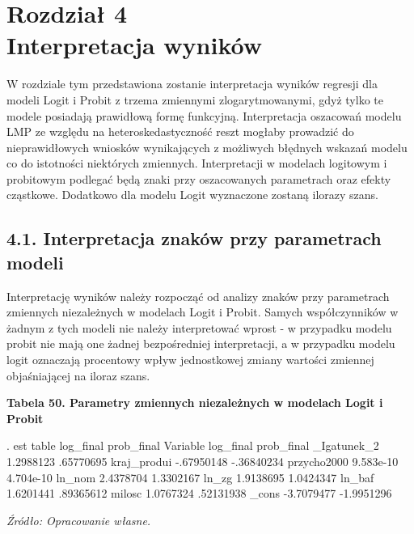 \newpage
\chapter*{Rozdział 4 \\ \vspace{1cm} Interpretacja wyników}
 
 W rozdziale tym przedstawiona zostanie interpretacja wyników regresji dla modeli Logit i Probit z trzema zmiennymi zlogarytmowanymi, gdyż tylko te modele posiadają prawidłową formę funkcyjną. Interpretacja oszacowań modelu LMP ze względu na heteroskedastyczność reszt mogłaby prowadzić do nieprawidłowych wniosków wynikających z możliwych błędnych wskazań modelu co do istotności niektórych zmiennych. Interpretacji w modelach logitowym i probitowym podlegać będą znaki przy oszacowanych parametrach oraz efekty cząstkowe. Dodatkowo dla modelu Logit wyznaczone zostaną ilorazy szans. 
 
\section*{4.1. Interpretacja znaków przy parametrach modeli}
 
Interpretację wyników należy rozpocząć od analizy znaków przy parametrach zmiennych niezależnych w modelach Logit i Probit. Samych współczynników w żadnym z tych modeli nie należy interpretować wprost - w przypadku modelu probit nie mają one żadnej bezpośredniej interpretacji, a w przypadku modelu logit oznaczają procentowy wpływ jednostkowej zmiany wartości zmiennej objaśniającej na iloraz szans.
 
\vspace{0.3cm}
\textbf{Tabela 50. Parametry zmiennych niezależnych w modelach Logit i Probit}
\begin{stlog}
. est table log_final prob_final 
    Variable {\VBAR} log_final    prob_final  
 _Igatunek_2 {\VBAR}  1.2988123    .65770695  
kraj_produ{\tytilde}i {\VBAR} -.67950148   -.36840234  
przycho{\tytilde}2000 {\VBAR}  9.583e-10    4.704e-10  
      ln_nom {\VBAR}  2.4378704    1.3302167  
       ln_zg {\VBAR}  1.9138695    1.0424347  
      ln_baf {\VBAR}  1.6201441    .89365612  
      milosc {\VBAR}  1.0767324    .52131938  
       _cons {\VBAR} -3.7079477   -1.9951296  
\end{stlog}
\textit{\footnotesize{Źródło: Opracowanie własne.}} \\

